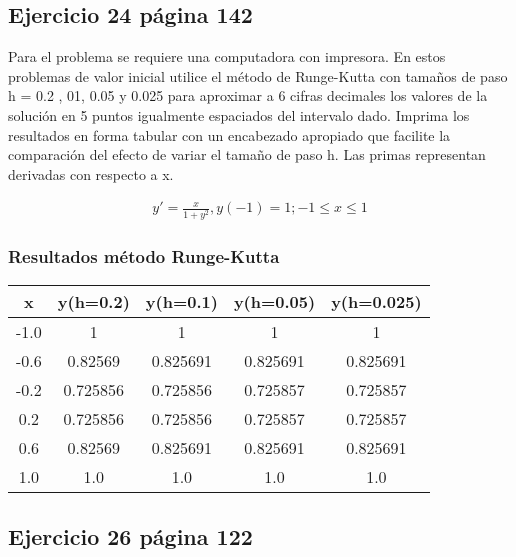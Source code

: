 \documentclass[a4paper.10pt]{article}
\begin{document}
\subsection{Ejercicio 24 p\'agina 142}
Para el problema se requiere una computadora con impresora. En estos problemas de valor inicial utilice el m\'etodo de Runge-Kutta con tama\~nos de paso h = 0.2 , 01, 0.05 y 0.025 para aproximar a 6 cifras decimales los valores de la soluci\'on en 5 puntos igualmente espaciados del intervalo dado. Imprima los resultados en forma tabular con un encabezado apropiado que facilite la comparaci\'on del efecto de variar el tama\~no de paso h. Las primas representan derivadas con respecto a x.

\begin{equation*}
    \begin{aligned}
        y'= \frac{x}{1+y^{2}},y(-1)=1;-1 \leq x \leq 1
    \end{aligned}
\end{equation*}


\subsubsection{Resultados m\'etodo Runge-Kutta}

\begin{table}[h]
    \centering
    \begin{tabular}{|c|c|c|c|c|}
        \hline
        x    & y(h=0.2) & y(h=0.1) & y(h=0.05) & y(h=0.025) \\
        \hline
        -1.0 & 1        & 1        & 1         & 1          \\
        -0.6 & 0.82569  & 0.825691 & 0.825691  & 0.825691   \\
        -0.2 & 0.725856 & 0.725856 & 0.725857  & 0.725857   \\
        0.2  & 0.725856 & 0.725856 & 0.725857  & 0.725857   \\
        0.6  & 0.82569  & 0.825691 & 0.825691  & 0.825691   \\
        1.0  & 1.0      & 1.0      & 1.0       & 1.0        \\
        \hline
    \end{tabular}
\end{table}

\subsection{Ejercicio 26 p\'agina 122}
\end{document}
